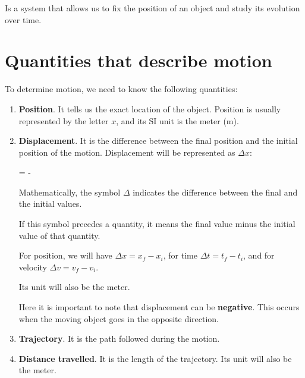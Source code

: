 \vspace*{6pt}
\begin{definition}
         Is a system that allows us to fix the position of an object and study its evolution over time.
\end{definition}

\section{Quantities that describe motion}

To determine motion, we need to know the following quantities:

\begin{enumerate}[label=\numberballmDarkTeal]
        \item \textbf{Position}.
        It tells us the exact location of the object.
        Position is usually represented by the letter \( x \), and its SI unit is the meter (\( \unit{\metre} \)).

        \item \textbf{Displacement}.
        It is the difference between the final position and the initial position of the motion.
        Displacement will be represented as \( \Delta x \):

        \vspace*{20pt}
        \begin{centeredequation}
            =
            -
        \end{centeredequation}
        \vspace{25pt}

        Mathematically, the symbol \( \Delta \) indicates the difference between the final and the initial values.

        If this symbol precedes a quantity, it means the final value minus the initial value of that quantity.

        For position, we will have \( \Delta x = x_f - x_i \), for time \( \Delta t = t_f - t_i \), and for velocity \( \Delta v = v_f - v_i \).

         Its unit will also be the meter.

        \begin{remark}
            Here it is important to note that displacement can be \textbf{negative}.
            This occurs when the moving object goes in the opposite direction.
        \end{remark}

        \item \textbf{Trajectory}.
        It is the path followed during the motion.

        \item \textbf{Distance travelled}.
        It is the length of the trajectory.
        Its unit will also be the meter.
\end{enumerate}

